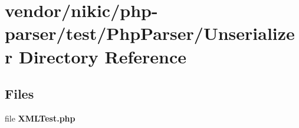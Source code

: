 \section{vendor/nikic/php-\/parser/test/\+Php\+Parser/\+Unserializer Directory Reference}
\label{dir_bc1e05cd4f29ba9d103c76c7293724bd}
\subsection*{Files}
\begin{DoxyCompactItemize}
\item 
file {\bf X\+M\+L\+Test.\+php}
\end{DoxyCompactItemize}
